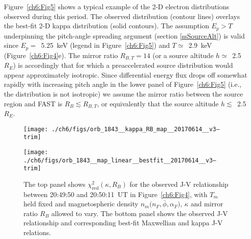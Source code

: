   Figure~\ref{ch6:Fig5} shows a typical example of the 2-D electron
  distributions observed during this period. The observed distribution (contour
  lines) overlays the best-fit 2-D kappa distribution (solid contours). The
  assumption $E_p > T$ underpinning the pitch-angle spreading argument (section
  \ref{ssSourceAlt}) is valid since $E_p =$~5.25~keV (legend in
  Figure~\ref{ch6:Fig5}) and $T \simeq$~2.9~keV (Figure~\ref{ch6:Fig4}e). The
  mirror ratio $R_{B,T} = 14$ (or a source altitude $h \simeq$~2.5~$R_E$) is
  accordingly that for which a preaccelerated source distribution would appear
  approximately isotropic. Since differential energy flux drops off somewhat
  rapidly with increasing pitch angle in the lower panel of
  Figure~\ref{ch6:Fig5} (i.e., the distribution is not isotropic) we assume the
  mirror ratio between the source region and FAST is $R_B \lesssim R_{B,T}$, or
  equivalently that the source altitude $h \lesssim$~2.5~$R_E$.


  \begin{figure}
    \centering

    \noindent\texttt{[image: ./ch6/figs/orb\_1843\_\_kappa\_RB\_map\_\_20170614\_\_v3--trim]}

    \vspace{1cm}

    \noindent\texttt{[image: ./ch6/figs/orb\_1843\_\_map\_linear\_\_bestfit\_\_20170614\_\_v3--trim]}




    \caption[Orbit 1843: Reduced chi-squared values for observed J-V curves and
    corresponding best-fit J-V curves.]{The top panel shows
      $\chi^2_{\mathrm{red}} ( \kappa, R_B)$ for the observed J-V relationship
      between 20:49:50 and 20:50:11~UT in Figure~\ref{ch6:Fig4}, with $T_m$ held
      fixed and magnetospheric density $n_m \big ( n_F, \bar{\phi}, \alpha_F
      \big )$, $\kappa$ and mirror ratio $R_B$ allowed to vary. The bottom panel
      shows the observed J-V relationship and corresponding best-fit Maxwellian
      and kappa J-V relations.}
    \label{ch6:Fig6}
  \end{figure}

